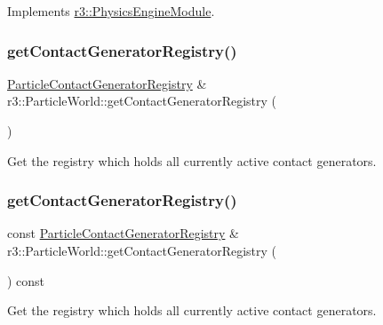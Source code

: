 Implements \mbox{\hyperlink{classr3_1_1_physics_engine_module_a3b1d0d9bea0a82534f367f6d728312d3}{r3\+::\+Physics\+Engine\+Module}}.

\mbox{\label{classr3_1_1_particle_world_a85fc9fcf5c51a5bbce206a35a82f8ccf}} 
\subsubsection{\texorpdfstring{get\+Contact\+Generator\+Registry()}{getContactGeneratorRegistry()}\hspace{0.1cm}{\footnotesize\ttfamily [1/2]}}
{\footnotesize\ttfamily \mbox{\hyperlink{classr3_1_1_particle_contact_generator_registry}{Particle\+Contact\+Generator\+Registry}} \& r3\+::\+Particle\+World\+::get\+Contact\+Generator\+Registry (\begin{DoxyParamCaption}{ }\end{DoxyParamCaption})}

Get the registry which holds all currently active contact generators. \mbox{\label{classr3_1_1_particle_world_ab5cd3adaed73294927de72f3293b0709}} 
\subsubsection{\texorpdfstring{get\+Contact\+Generator\+Registry()}{getContactGeneratorRegistry()}\hspace{0.1cm}{\footnotesize\ttfamily [2/2]}}
{\footnotesize\ttfamily const \mbox{\hyperlink{classr3_1_1_particle_contact_generator_registry}{Particle\+Contact\+Generator\+Registry}} \& r3\+::\+Particle\+World\+::get\+Contact\+Generator\+Registry (\begin{DoxyParamCaption}{ }\end{DoxyParamCaption}) const}

Get the registry which holds all currently active contact generators. \mbox{\label{classr3_1_1_particle_world_aaa3f952fdfd8862673d41afa078245bf}} 
